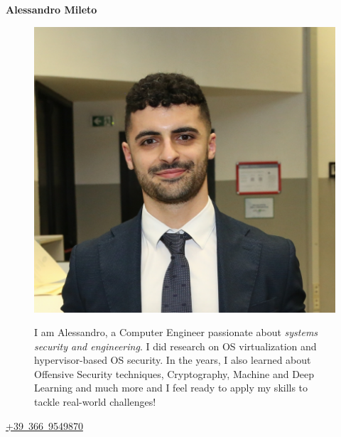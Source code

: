 \documentclass[10pt, letterpaper]{article}
\newenvironment{header}{
        \setlength{\topsep}{0pt}\par\kern\topsep\centering\color{primaryColor}\linespread{1.5}
    }{
        \par\kern\topsep
    } %
\let\hrefWithoutArrow\href
\renewcommand{\href}[2]{\hrefWithoutArrow{#1}{\mbox{\ifthenelse{\equal{#2}{}}{ }{#2 }\raisebox{.15ex}{\footnotesize \faExternalLink*}}}}
\begin{document}
    
    \begin{header}
        \fontsize{30 pt}{30 pt}
        \textbf{Alessandro Mileto}

        \vspace{0.3 cm}
\begin{figure}[h]
    \centering
    \begin{minipage}{0.2\textwidth}
        \includegraphics[width=\textwidth]{io.png}
    \end{minipage}%
    \hspace{0.3cm }
    \begin{minipage}{0.6\textwidth}
        \begin{samepage}
        \raggedright
        I am Alessandro, a Computer Engineer passionate about \textit{systems security and engineering}.  I did research on OS virtualization and hypervisor-based OS security. In the years, I also learned about Offensive Security techniques, Cryptography, Machine and Deep Learning and much more and I feel ready to apply my skills to tackle real-world challenges!
        \end{samepage}
    \end{minipage}
\end{figure}
        \normalsize
        \mbox{\hrefWithoutArrow{tel:+393669549870}{{\footnotesize\faPhone*}\hspace*{0.13cm}+39 366 9549870}}
        \hspace*{0.5 cm}

\end{header}
\end{document}
